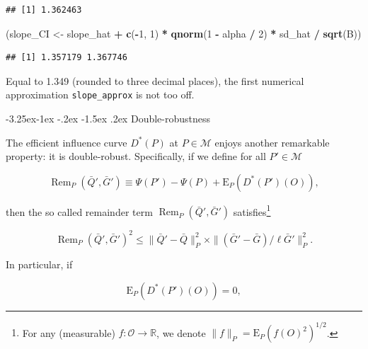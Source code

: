 \documentclass[]{article}
\makeatletter
\newenvironment{Shaded}{\begin{snugshade}}{\end{snugshade}}
\newcommand{\DecValTok}[1]{\textcolor[rgb]{0.00,0.00,0.81}{#1}}
\newcommand{\KeywordTok}[1]{\textcolor[rgb]{0.13,0.29,0.53}{\textbf{#1}}}
\newcommand{\NormalTok}[1]{#1}
\newcommand{\OperatorTok}[1]{\textcolor[rgb]{0.81,0.36,0.00}{\textbf{#1}}}
\newcommand{\StringTok}[1]{\textcolor[rgb]{0.31,0.60,0.02}{#1}}
\let\rmarkdownfootnote\footnote%
\def\footnote{\protect\rmarkdownfootnote}
\renewcommand\subsection{\@startsection{subsection}{3}{\z@}%
                                     {-3.25ex\@plus -1ex \@minus -.2ex}%
                                     {-1.5ex \@plus .2ex}%
                                     {\normalfont\normalsize\bfseries}}
\DeclareMathOperator{\Rem}{Rem}
\newcommand{\bbR}{\mathbb{R}}
\newcommand{\calM}{\mathcal{M}}
\newcommand{\calO}{\mathcal{O}}
\newcommand{\Exp}{\textrm{E}}
\newcommand{\Gbar}{\bar{G}}
\newcommand{\Qbar}{\bar{Q}}
\theoremstyle{definition}
\theoremstyle{definition}
\theoremstyle{definition}
\theoremstyle{remark}
\makeatother
\begin{document}
\begin{verbatim}
## [1] 1.362463
\end{verbatim}

\begin{Shaded}
\begin{Highlighting}[]
\NormalTok{(slope_CI <-}\StringTok{ }\NormalTok{slope_hat }\OperatorTok{+}\StringTok{ }\KeywordTok{c}\NormalTok{(}\OperatorTok{-}\DecValTok{1}\NormalTok{, }\DecValTok{1}\NormalTok{) }\OperatorTok{*}\StringTok{ }\KeywordTok{qnorm}\NormalTok{(}\DecValTok{1} \OperatorTok{-}\StringTok{ }\NormalTok{alpha }\OperatorTok{/}\StringTok{ }\DecValTok{2}\NormalTok{) }\OperatorTok{*}\StringTok{ }\NormalTok{sd_hat }\OperatorTok{/}\StringTok{ }\KeywordTok{sqrt}\NormalTok{(B))}
\end{Highlighting}
\end{Shaded}

\begin{verbatim}
## [1] 1.357179 1.367746
\end{verbatim}

Equal to 1.349 (rounded to three decimal places), the first numerical
approximation \texttt{slope\_approx} is not too off.

\subsection{Double-robustness}
\label{subsec:double:robustness}

The efficient influence curve \(D^{*}(P)\) at \(P \in \calM\) enjoys
another remarkable property: it is double-robust. Specifically, if we
define for all \(P' \in \calM\)

\begin{equation}\label{eq:rem:one} \Rem_{P} (\Qbar',  \Gbar')\equiv \Psi(P') -
\Psi(P) + \Exp_{P} (D^{*}(P') (O)), \end{equation}

then the so called remainder term \(\Rem_{P} (\Qbar', \Gbar')\)
satisfies\footnote{For  any   (measurable)  $f:\calO  \to  \bbR$,   we  denote
$\|f\|_{P} = \Exp_{P} (f(O)^{2})^{1/2}$.}

\begin{equation}\label{eq:rem:two}   \Rem_{P}    (\Qbar',   \Gbar')^{2}   \leq
\|\Qbar'  - \Qbar\|_{P}^{2}  \times  \|(\Gbar' -  \Gbar)/\ell\Gbar'\|_{P}^{2}.
\end{equation}

In particular, if

\begin{equation}\label{eq:solves:eic}     \Exp_{P}    (D^{*}(P')     (O))    =
0,\end{equation}
\end{document}
